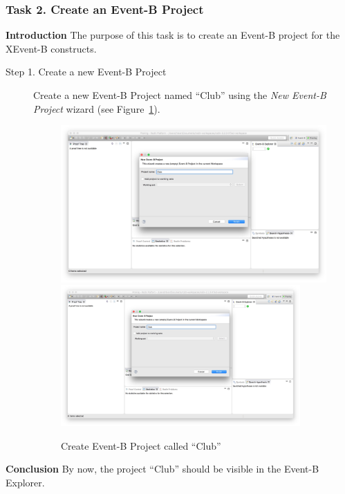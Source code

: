 \subsubsection{Task 2. Create an Event-B Project}
\textbf{Introduction} The purpose of this task is to create an Event-B project for the XEvent-B constructs. 
\begin{description}
\item[Step 1. Create a new Event-B Project] Create a new Event-B Project named ``Club'' using the \emph{New Event-B Project} wizard (see Figure~\ref{fig:CreateProject}).
\begin{figure}[!htbp]
  \centering
  \ifplastex
  \includegraphics[width=512]{figures/CreateProject}
  \else
  \includegraphics[width=0.9\textwidth]{figures/CreateProject}
  \fi
  \caption{Create Event-B Project called ``Club''}
  \label{fig:CreateProject}
\end{figure}

\end{description}
\textbf{Conclusion} By now, the project ``Club'' should be visible in the Event-B Explorer.


